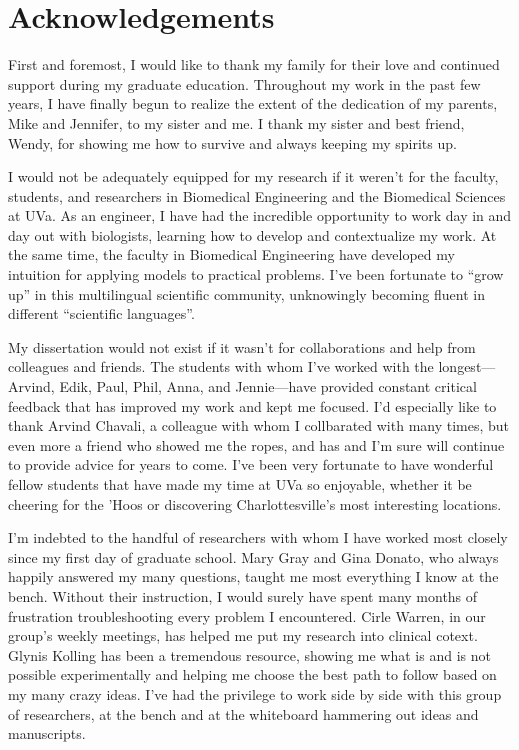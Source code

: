 \chapter{Acknowledgements}

First and foremost, I would like to thank my family for their
love and continued support during my graduate education. 
Throughout my work in the past few years, I have finally begun to realize
the extent of the dedication of my parents, Mike and Jennifer, to
my sister and me. I thank my sister and 
best friend, Wendy, for showing me how to survive and always 
keeping my spirits up.

I would not be adequately equipped for my research if it weren't for
the faculty, students, and researchers in Biomedical Engineering
and the Biomedical Sciences at UVa.
As an engineer, I have had the incredible opportunity to work day in and day out
with biologists, learning how to develop and contextualize my work.
At the same time, the faculty in Biomedical Engineering have developed my intuition for applying
models to practical problems.
I've been fortunate to ``grow up'' in 
this multilingual scientific community, unknowingly becoming fluent in different 
``scientific languages''.

My dissertation would not exist if it wasn't for collaborations
and help from colleagues and friends.
The students with whom I've worked with the longest---Arvind, 
Edik, Paul, Phil, Anna, and Jennie---have provided constant critical feedback
that has improved my work and kept me focused. 
I'd especially like to thank
Arvind Chavali, a colleague with whom I collbarated with many times, but even more
a friend who showed me the ropes, and has and I'm sure will continue to provide advice
for years to come. I've been very fortunate to have wonderful fellow students that
have made my time at UVa so enjoyable, whether it be cheering for the 'Hoos
or discovering Charlottesville's most interesting locations.

I'm indebted to the handful of researchers with whom I have worked most closely
since my first day of graduate school. 
Mary Gray and Gina Donato, who always happily
answered my many questions, taught me most everything I know at the bench.
Without their instruction, I would surely have spent many months of frustration
troubleshooting every problem I encountered.
Cirle Warren, in our group's weekly meetings, has helped me
put my research into clinical cotext.
Glynis Kolling has been a tremendous resource, showing me what 
is and is not possible experimentally and helping me choose the best
path to follow based on my many crazy ideas.
I've had the privilege to work side by side with this group of researchers,
at the bench and at the whiteboard hammering out ideas and manuscripts.

